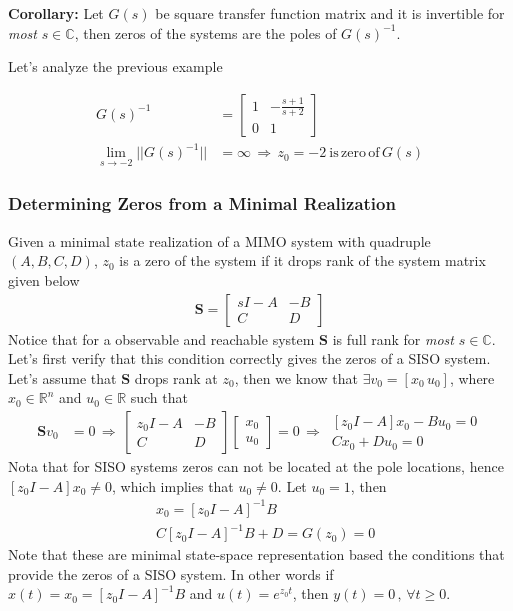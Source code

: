 \documentclass[twoside]{article}
\begin{document}
\textbf{Corollary:} Let $G(s)$ be square transfer function matrix and it is invertible for \textit{most} $s \in \mathbb{C}$, then zeros of the systems
are the poles of $G(s)^{-1}$. 

Let's analyze the previous example 

\begin{align*}
G(s)^{-1} &= \left[ \begin{array}{ccc} 1 & -\frac{s+1}{s+2}  \\  
	0 & 1  \end{array} \right]
	\\
\lim_{s \to -2} || G(s)^{-1} || &= \infty \, \Rightarrow \, z_0 = - 2 \ \mathrm{is} \, \mathrm{zero} \, \mathrm{of} \, G(s)
\end{align*}

\subsubsection{Determining Zeros from a Minimal Realization}

Given a minimal state realization of a MIMO system with quadruple $(A,B,C,D)$, $z_0$ is a zero
of the system if it drops rank of the system matrix given below
%
\begin{align*}
\mathbf{S} = \left[ \begin{array}{cc} s I - A & -B \\ C & D \end{array} \right]
\end{align*}
%
Notice that for a observable and reachable system $\mathbf{S}$ is full rank for \textit{most} $s \in \mathbb{C}$. 
Let's first verify that this condition correctly gives the zeros of a SISO system. Let's assume that 
$\mathbf{S}$ drops rank at $z_0$, then we know that $\exists v_0 = [x_0 \, u_0]$, where $x_0 \in \mathbb{R}^{n}$
and $u_0 \in \mathbb{R}$ such that 
%
\begin{align*}
\mathbf{S} v_0 &= 0
\, \Rightarrow \,
\left[ \begin{array}{cc} z_0 I - A & -B \\ C & D \end{array} \right] \left[ \begin{array}{c} x_0 \\ u_0 \end{array} \right] = 0
\, \Rightarrow \,
 \begin{array}{cc} \left[ z_0 I - A \right] x_0 - B u_0 = 0 \\ C x_0 + D u_0 = 0 \end{array}
\end{align*}
%
Nota that for SISO systems zeros can not be located at the pole locations, hence $ \left[ z_0 I - A \right] x_0 \neq 0$, which implies that $u_0 \neq 0$. Let $u_0 = 1$, then 
%
\begin{align*}
&x_0 =  \left[ z_0 I - A \right]^{-1} B  \\
&C \left[ z_0 I - A \right]^{-1} B  + D = G(z_0) =  0 
\end{align*}
%
Note that these are minimal state-space representation based the conditions that provide the zeros of a SISO system. In other words if $x(t) = x_0 = \left[ z_0 I - A \right]^{-1} B$ and $u(t) = e^{z_0 t}$, then $y(t) = 0 \, , \, \forall t \geq 0$. 
\end{document}
